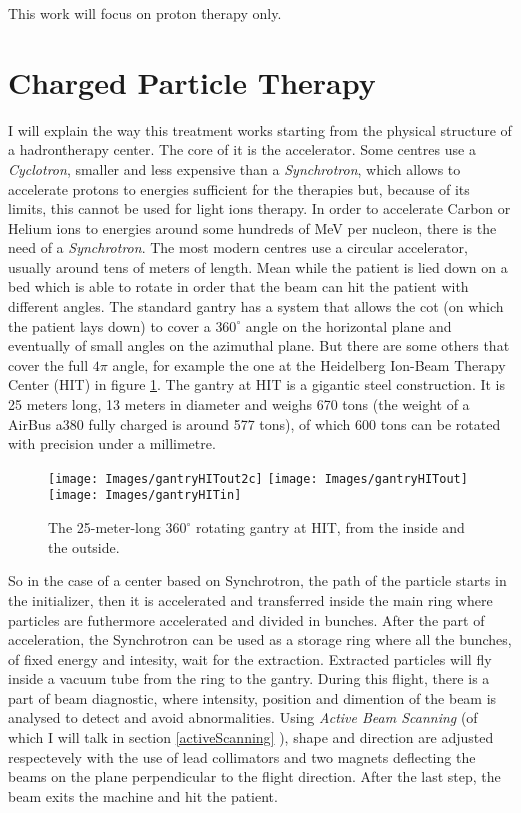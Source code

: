 \documentclass[12pt, a4paper, twoside]{book}
\begin{document}
This work will focus on proton therapy only. 

\section{Charged Particle Therapy}
I will explain the way this treatment works starting from the physical structure of a hadrontherapy center. The core of it is the accelerator. Some centres use a \emph{Cyclotron}, smaller and less expensive than a \emph{Synchrotron}, which allows to accelerate protons to energies sufficient for the therapies but, because of its limits, this cannot be used for light ions therapy. In order to accelerate Carbon or Helium ions to energies around some hundreds of MeV per nucleon, there is the need of a \emph{Synchrotron}. The most modern centres use a circular accelerator, usually around tens of meters of length. Mean while the patient is lied down on a bed which is able to rotate in order that the beam can hit the patient with different angles. The standard gantry has a system that allows the cot (on which the patient lays down) to cover a $360^\circ$ angle on the horizontal plane and eventually of small angles on the azimuthal plane. But there are some others that cover the full $4\pi$ angle, for example the one at the Heidelberg Ion-Beam Therapy Center (HIT) in figure \ref{fig:HIT}. The gantry at HIT is a gigantic steel construction. It is 25 meters long, 13 meters in diameter and weighs 670 tons (the weight of a AirBus a380 fully charged is around 577 tons), of which 600 tons can be rotated with precision under a millimetre. 
\begin{figure}[t]
{\texttt{[image: Images/gantryHITout2c]}}
{\texttt{[image: Images/gantryHITout]}}\\
{\texttt{[image: Images/gantryHITin]}}
\caption{The 25-meter-long $360^\circ$ rotating gantry at HIT, from the inside and the outside.}
\label{fig:HIT}
\end{figure}

So in the case of a center based on Synchrotron, the path of the particle starts in the initializer, then it is accelerated and transferred inside the main ring where particles are futhermore accelerated and divided in bunches. After the part of acceleration, the Synchrotron can be used as a storage ring where all the bunches, of fixed energy and intesity, wait for the extraction. Extracted particles will fly inside a vacuum tube from the ring to the gantry. During this flight, there is a part of beam diagnostic, where intensity, position and dimention of the beam is analysed to detect and avoid abnormalities. Using \emph{Active Beam Scanning} (of which I will talk in section \ref{activeScanning} ), shape and direction are adjusted respectevely with the use of lead collimators and two magnets deflecting the beams on the plane perpendicular to the flight direction. After the last step, the beam exits the machine and hit the patient.
\end{document}
